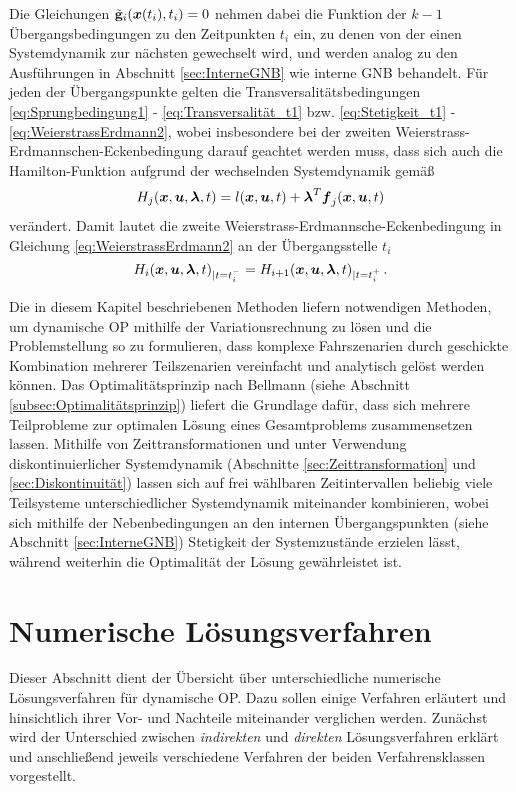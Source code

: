 Die Gleichungen $\tilde{\mathbf{g}}_i(\boldsymbol{x}(t_i),t_i) = 0$ nehmen dabei die Funktion der $k-1$ Übergangsbedingungen zu den Zeitpunkten $t_i$ ein, zu denen von der einen Systemdynamik zur nächsten gewechselt wird, und werden analog zu den Ausführungen in Abschnitt \ref{sec:InterneGNB} wie interne \gls{GNB} behandelt. Für jeden der Übergangspunkte gelten die Transversalitätsbedingungen \eqref{eq:Sprungbedingung1} - \eqref{eq:Transversalität_t1} bzw. \eqref{eq:Stetigkeit_t1} - \eqref{eq:WeierstrassErdmann2}, wobei insbesondere bei der zweiten Weierstrass-Erdmannschen-Eckenbedingung darauf geachtet werden muss, dass sich auch die Hamilton-Funktion aufgrund der wechselnden Systemdynamik gemäß
\begin{equation}
	H_j(\boldsymbol{x},\boldsymbol{u},\boldsymbol{\lambda},t) = l(\boldsymbol{x},\boldsymbol{u},t) + \boldsymbol{\lambda}^T\boldsymbol{f}_j(\boldsymbol{x},\boldsymbol{u},t) \label{eq:Hamilton_j}
\end{equation} 
verändert. Damit lautet die zweite Weierstrass-Erdmannsche-Eckenbedingung in Gleichung \eqref{eq:WeierstrassErdmann2} an der Übergangsstelle $t_i$
\begin{equation}
H_i(\boldsymbol{x},\boldsymbol{u},\boldsymbol{\lambda},t)_{|t=t_i^-} = H_{i+1}(\boldsymbol{x},\boldsymbol{u},\boldsymbol{\lambda},t)_{|t=t_i^+}\,. \label{eq:WeierstrassErdmann2_j}
\end{equation}

Die in diesem Kapitel beschriebenen Methoden liefern notwendigen Methoden, um dynamische \gls{OP} mithilfe der Variationsrechnung zu lösen und die Problemstellung so zu formulieren, dass komplexe Fahrszenarien durch geschickte Kombination mehrerer Teilszenarien vereinfacht und analytisch gelöst werden können. Das Optimalitätsprinzip nach Bellmann (siehe Abschnitt \ref{subsec:Optimalitätsprinzip}) liefert die Grundlage dafür, dass sich mehrere Teilprobleme zur optimalen Lösung eines Gesamtproblems zusammensetzen lassen. Mithilfe von Zeittransformationen und unter Verwendung diskontinuierlicher Systemdynamik (Abschnitte \ref{sec:Zeittransformation} und \ref{sec:Diskontinuität}) lassen sich auf frei wählbaren Zeitintervallen beliebig viele Teilsysteme unterschiedlicher Systemdynamik miteinander kombinieren, wobei sich mithilfe der Nebenbedingungen an den internen Übergangspunkten (siehe Abschnitt \ref{sec:InterneGNB}) Stetigkeit der Systemzustände erzielen lässt, während weiterhin die Optimalität der Lösung gewährleistet ist.
\section{Numerische Lösungsverfahren}\label{sec:Lösungsverfahren}
Dieser Abschnitt dient der Übersicht über unterschiedliche numerische Lösungsverfahren für dynamische \gls{OP}. Dazu sollen einige Verfahren erläutert und hinsichtlich ihrer Vor- und Nachteile miteinander verglichen werden. Zunächst wird der Unterschied zwischen \textit{indirekten} und \textit{direkten} Lösungsverfahren erklärt und anschließend jeweils verschiedene Verfahren der beiden Verfahrensklassen vorgestellt.
